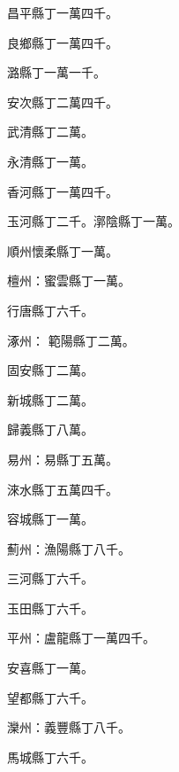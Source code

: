 \begin{pinyinscope}
 昌平縣丁一萬四千。



 良鄉縣丁一萬四千。



 潞縣丁一萬一千。



 安次縣丁二萬四千。



 武清縣丁二萬。



 永清縣丁一萬。



 香河縣丁一萬四千。



 玉河縣丁二千。漷陰縣丁一萬。



 順州懷柔縣丁一萬。



 檀州：蜜雲縣丁一萬。



 行唐縣丁六千。



 涿州：
 範陽縣丁二萬。



 固安縣丁二萬。



 新城縣丁二萬。



 歸義縣丁八萬。



 易州：易縣丁五萬。



 淶水縣丁五萬四千。



 容城縣丁一萬。



 薊州：漁陽縣丁八千。



 三河縣丁六千。



 玉田縣丁六千。



 平州：盧龍縣丁一萬四千。



 安喜縣丁一萬。



 望都縣丁六千。



 灤州：義豐縣丁八千。



 馬城縣丁六千。




\end{pinyinscope}
